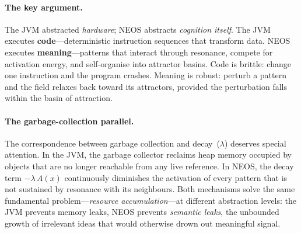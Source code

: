 \paragraph{The key argument.}
The JVM abstracted \emph{hardware}; NEOS abstracts \emph{cognition
itself}.  The JVM executes \textbf{code}---deterministic instruction
sequences that transform data.  NEOS executes \textbf{meaning}---patterns
that interact through resonance, compete for activation energy, and
self-organise into attractor basins.  Code is brittle: change one
instruction and the program crashes.  Meaning is robust: perturb a
pattern and the field relaxes back toward its attractors, provided the
perturbation falls within the basin of attraction.

\paragraph{The garbage-collection parallel.}
The correspondence between garbage collection and decay~($\lambda$)
deserves special attention.  In the JVM, the garbage collector reclaims
heap memory occupied by objects that are no longer reachable from any
live reference.  In NEOS, the decay term
$-\lambda\,A(x)$ continuously diminishes the activation of every pattern
that is not sustained by resonance with its neighbours.  Both mechanisms
solve the same fundamental problem---\emph{resource accumulation}---at
different abstraction levels: the JVM prevents memory leaks, NEOS
prevents \emph{semantic leaks}, the unbounded growth of irrelevant ideas
that would otherwise drown out meaningful signal.

